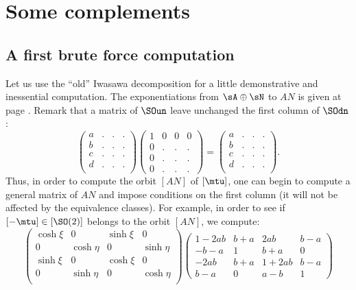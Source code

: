 \section{Some complements}

\subsection{A first brute force computation}

Let us use the ``old''{} Iwasawa decomposition for a little demonstrative and inessential computation. The exponentiations from $\sA\oplus\sN$ to $AN$ is given at page \pageref{pg:exp_AN}. Remark that a matrix of $\SOun$ leave unchanged the first column of $\SOdn$:
\[
	\begin{pmatrix}
		a & . & . & . \\
		b & . & . & . \\
		c & . & . & . \\
		d & . & . & . \\
	\end{pmatrix}
	\begin{pmatrix}
		1 & 0 & 0 & 0 \\
		0 & . & . & . \\
		0 & . & . & . \\
		0 & . & . & .
	\end{pmatrix}=
	\begin{pmatrix}
		a & . & . & . \\
		b & . & . & . \\
		c & . & . & . \\
		d & . & . & . \\
	\end{pmatrix}.
\]
Thus, in order to compute the orbit $[AN]$ of $[\mtu]$, one can begin to compute a general matrix of $AN$ and impose conditions on the first column (it will not be affected by the equivalence classes). For example, in order to see if $[-\mtu]\in [\SO(2)]$ belongs to the orbit $[AN]$, we compute:\label{PgExplAN}
\begin{equation}\label{eq:gene_R}
	\begin{pmatrix}
		\cosh\xi & 0         & \sinh\xi & 0         \\
		0        & \cosh\eta & 0        & \sinh\eta \\
		\sinh\xi & 0         & \cosh\xi & 0         \\
		0        & \sinh\eta & 0        & \cosh\eta \\
	\end{pmatrix}
	\begin{pmatrix}
		1-2ab & b+a & 2ab   & b-a \\
		-b-a  & 1   & b+a   & 0   \\
		-2ab  & b+a & 1+2ab & b-a \\
		b-a   & 0   & a-b   & 1
	\end{pmatrix}
\end{equation}
